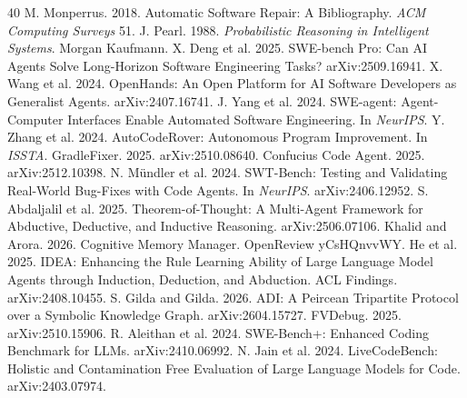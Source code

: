 \documentclass[sigconf,review,anonymous]{acmart}
\begin{document}
\begin{thebibliography}{40}
 M. Monperrus. 2018. Automatic Software Repair: A Bibliography. \textit{ACM Computing Surveys} 51.
 J. Pearl. 1988. \textit{Probabilistic Reasoning in Intelligent Systems}. Morgan Kaufmann.
 X. Deng et al. 2025. SWE-bench Pro: Can AI Agents Solve Long-Horizon Software Engineering Tasks? arXiv:2509.16941.
 X. Wang et al. 2024. OpenHands: An Open Platform for AI Software Developers as Generalist Agents. arXiv:2407.16741.
 J. Yang et al. 2024. SWE-agent: Agent-Computer Interfaces Enable Automated Software Engineering. In \textit{NeurIPS}.
 Y. Zhang et al. 2024. AutoCodeRover: Autonomous Program Improvement. In \textit{ISSTA}.
 GradleFixer. 2025. arXiv:2510.08640.
 Confucius Code Agent. 2025. arXiv:2512.10398.
 N. Mündler et al. 2024. SWT-Bench: Testing and Validating Real-World Bug-Fixes with Code Agents. In \textit{NeurIPS}. arXiv:2406.12952.
 S. Abdaljalil et al. 2025. Theorem-of-Thought: A Multi-Agent Framework for Abductive, Deductive, and Inductive Reasoning. arXiv:2506.07106.
 Khalid and Arora. 2026. Cognitive Memory Manager. OpenReview yCsHQnvvWY.
 He et al. 2025. IDEA: Enhancing the Rule Learning Ability of Large Language Model Agents through Induction, Deduction, and Abduction. ACL Findings. arXiv:2408.10455.
 S. Gilda and Gilda. 2026. ADI: A Peircean Tripartite Protocol over a Symbolic Knowledge Graph. arXiv:2604.15727.
 FVDebug. 2025. arXiv:2510.15906.
 R. Aleithan et al. 2024. SWE-Bench+: Enhanced Coding Benchmark for LLMs. arXiv:2410.06992.
 N. Jain et al. 2024. LiveCodeBench: Holistic and Contamination Free Evaluation of Large Language Models for Code. arXiv:2403.07974.

\end{thebibliography}
\end{document}

